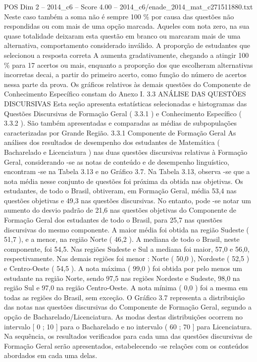 \begin{textsample}{POS Dim 2 – 2014\_c6 – Score 4.00 – 2014\_c6/enade\_2014\_mat\_c271511880.txt}
Neste caso também a soma não é sempre 100 \% por causa das questões não respondidas ou com mais de uma opção marcada.
Aqueles com nota zero, na sua quase totalidade deixaram esta questão em branco ou marcaram mais de uma alternativa, comportamento considerado inválido.
A proporção de estudantes que selecionou a resposta correta A aumenta gradativamente, chegando a atingir 100 \% para 17 acertos ou mais, enquanto a proporção dos que escolheram alternativas incorretas decai, a partir do primeiro acerto, como função do número de acertos nessa parte da prova.
Os gráficos relativos às demais questões do Componente de Conhecimento Específico constam do Anexo I. 3.3 ANÁLISE DAS QUESTÕES DISCURSIVAS Esta seção apresenta estatísticas selecionadas e histogramas das Questões Discursivas de Formação Geral ( 3.3.1 ) e Conhecimento Específico ( 3.3.2 ).
São também apresentadas e comparadas as médias de subpopulações caracterizadas por Grande Região. 3.3.1 Componente de Formação Geral As análises dos resultados de desempenho dos estudantes de Matemática ( Bacharelado e Licenciatura ) nas duas questões discursivas relativas à Formação Geral, considerando -se as notas de conteúdo e de desempenho linguístico, encontram -se na Tabela 3.13 e no Gráfico 3.7.
Na Tabela 3.13, observa -se que a nota média nesse conjunto de questões foi próxima da obtida nas objetivas.
Os estudantes, de todo o Brasil, obtiveram, em Formação Geral, média 53,4 nas questões objetivas e 49,3 nas questões discursivas.
No entanto, pode -se notar um aumento do desvio padrão de 21,6 nas questões objetivas do Componente de Formação Geral dos estudantes de todo o Brasil, para 25,7 nas questões discursivas do mesmo componente.
A maior média foi obtida na região Sudeste ( 51,7 ), e a menor, na região Norte ( 46,2 ).
A mediana de todo o Brasil, neste componente, foi 54,5.
Nas regiões Sudeste e Sul a mediana foi maior, 57,0 e 56,0, respectivamente.
Nas demais regiões foi menor : Norte ( 50,0 ), Nordeste ( 52,5 ) e Centro-Oeste ( 54,5 ).
A nota máxima ( 99,0 ) foi obtida por pelo menos um estudante na região Norte, sendo 97,5 nas regiões Nordeste e Sudeste, 98,0 na região Sul e 97,0 na região Centro-Oeste.
A nota mínima ( 0,0 ) foi a mesma em todas as regiões do Brasil, sem exceção.
O Gráfico 3.7 representa a distribuição das notas nas questões discursivas do Componente de Formação Geral, segundo a opção de Bacharelado/Licenciatura.
As modas destas distribuições ocorrem no intervalo [ 0 ; 10 ] para o Bacharelado e no intervalo ( 60 ; 70 ] para Licenciatura.
Na sequência, os resultados verificados para cada uma das questões discursivas de Formação Geral serão apresentados, estabelecendo -se relações com os conteúdos abordados em cada uma delas.

\end{textsample}
